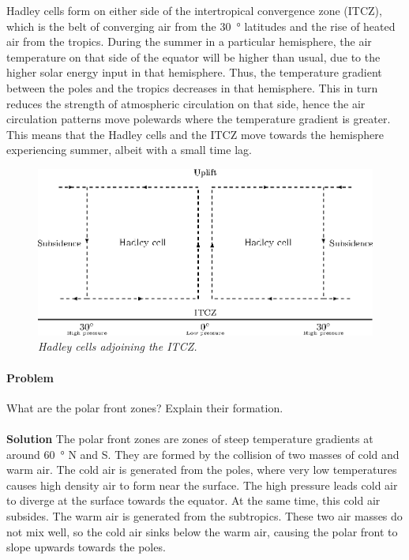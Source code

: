 \documentclass[10pt]{article}
\newcounter{prob}
\def\problem{\stepcounter{prob}\paragraph{Problem \arabic{prob}}}
\def\solution{\\\\\textbf{Solution }}
\begin{document}
        Hadley cells form on either side of the intertropical convergence zone (ITCZ), which is the belt of converging air from the \SI{30}{\degree}
        latitudes and the rise of heated air from the tropics. During the summer in a particular hemisphere, the air temperature on
        that side of the equator will be higher than usual, due to the higher solar energy input in that hemisphere. Thus, the temperature gradient
        between the poles and the tropics decreases in that hemisphere. This in turn reduces the strength of atmospheric circulation on that side,
        hence the air circulation patterns move polewards where the temperature gradient is greater. This means that the Hadley cells and the ITCZ
        move towards the hemisphere experiencing summer, albeit with a small time lag.
        
        \begin{figure}[h!]
        \begin{center}
                \includegraphics{./hadley.eps}
        \end{center}
        \caption*{\it Hadley cells adjoining the ITCZ.}
        \label{fig:hadley_cells}
        \end{figure}

        \problem What are the polar front zones? Explain their formation.
        \solution The polar front zones are zones of steep temperature gradients at around \SI{60}{\degree} N and S.
        They are formed by the collision of two masses of cold and warm air. The cold air is generated from the poles,
        where very low temperatures causes high density air to form near the surface. The high pressure leads cold air
        to diverge at the surface towards the equator. At the same time, this cold air subsides.
        The warm air is generated from the subtropics. These two air masses do not mix well, so the cold air sinks below the warm air,
        causing the polar front to slope upwards towards the poles.
\end{document}
